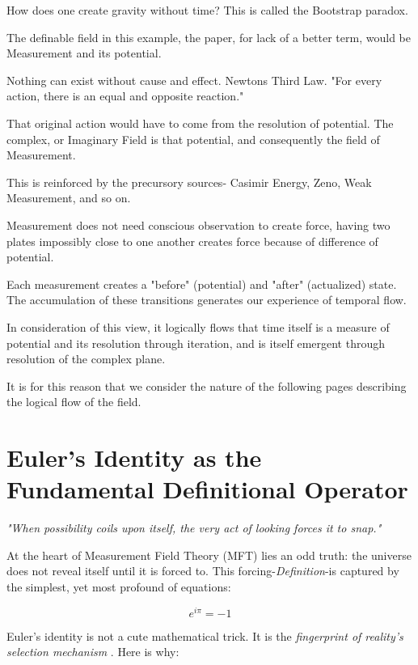 How does one create gravity without time? This is called the Bootstrap paradox. 

The definable field in this example, the paper, for lack of a better term, would be Measurement and its potential. 

Nothing can exist without cause and effect. Newtons Third Law. "For every action, there is an equal and opposite reaction." 

That original action would have to come from the resolution of potential. The complex, or Imaginary Field is that potential, and consequently the field of Measurement. 

This is reinforced by the precursory sources- Casimir Energy, Zeno, Weak Measurement, and so on. 

Measurement does not need conscious observation to create force, having two plates impossibly close to one another creates force because of difference of potential.

Each measurement creates a "before" (potential) and "after" (actualized) state. The accumulation of these transitions generates our experience of temporal flow.

In consideration of this view, it logically flows that time itself is a measure of potential and its resolution through iteration, and is itself emergent through resolution of the complex plane.  

It is for this reason that we consider the nature of the following pages describing the logical flow of the field. 

\section{Euler's Identity as the Fundamental Definitional Operator}

\begin{flushright}
  {\itshape "When possibility coils upon itself, the very act of looking forces it to snap."}
\end{flushright}

At the heart of Measurement Field Theory (MFT) lies an odd truth: the universe does not reveal itself until it is forced to. This forcing-\emph{Definition}-is captured by the simplest, yet most profound of equations:

\begin{equation}
  e^{i\pi} = -1\label{eq:euler}
\end{equation}

Euler's identity is not a cute mathematical trick. It is the \emph{fingerprint of reality's selection mechanism} \cite{gothen_eulers_2022,woit_eulers_2005,shurman_eulers_2014, angeles_role_2015}. Here is why:

